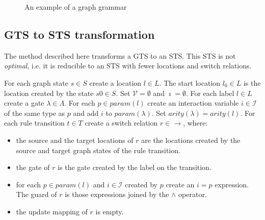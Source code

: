 \begin{figure}[ht]
  \begin{center}
    \hspace{20px}
    \hspace{20px}
    \hspace{20px}
    
    \hspace{20px}
    \hspace{20px}
  \end{center}
  \caption{An example of a graph grammar}
  \label{fig:gts}
\end{figure}

\subsection{GTS to STS transformation}\label{sec:gts_sts_trafo}
The method described here transforms a GTS to an STS. This STS is not \textit{optimal}, i.e. it is reducible to an STS with fewer locations and switch relations.

For each graph state $s \in S$ create a location $l \in L$. The start location $l_0 \in L$ is the location created by the state $s0 \in S$. Set $\mathcal{V} = \emptyset$ and $\imath = \emptyset$. For each label $l \in L$ create a gate $\lambda \in \Lambda$. For each $p \in \mathit{param}(l)$ create an interaction variable $i \in \mathcal{I}$ of the same type as $p$ and add $i$ to $param(\lambda)$. Set $\mathit{arity}(\lambda) = \mathit{arity}(l)$. For each rule transition $t \in T$ create a switch relation $r \in \rightarrow$, where:
\begin{itemize}
  \item the source and the target locations of $r$ are the locations created by the source and target graph states of the rule transition.
  \item the gate of $r$ is the gate created by the label on the transition.
  \item for each $p \in \mathit{param}(l)$ and $i \in \mathcal{I}$ created by $p$ create an $i = p$ expression. The guard of $r$ is those expressions joined by the $\land$ operator.
  \item the update mapping of $r$ is empty.
\end{itemize}

